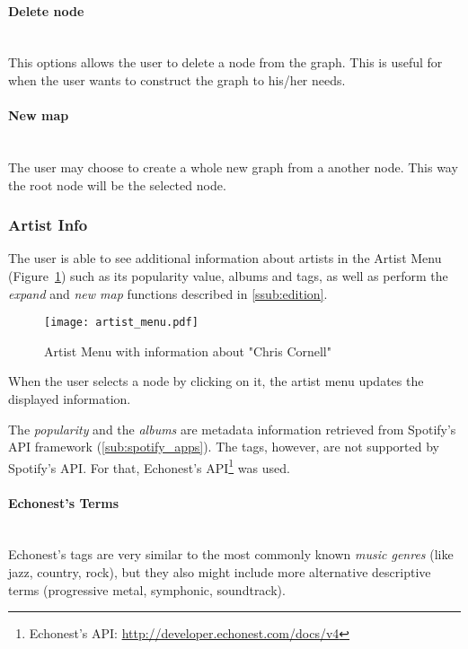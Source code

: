       \paragraph{Delete node} \hfill \\
      This options allows the user to delete a node from the graph.
      This is useful for when the user wants to construct the graph to his/her needs.

      \paragraph{New map} \hfill \\
      The user may choose to create a whole new graph from a another node.
      This way the root node will be the selected node.



    \subsubsection{Artist Info} %
      \label{ssub:artist_info}
      The user is able to see additional information about artists in the Artist Menu (Figure~\ref{fig:artist_menu}) such as its popularity value, albums and tags, as well as perform the \emph{expand} and \emph{new map} functions described in \ref{ssub:edition}.
      \begin{figure}[tb]
        \begin{center}
          \texttt{[image: artist\_menu.pdf]}
        \end{center}
        \caption{Artist Menu with information about "Chris Cornell"}
        \label{fig:artist_menu}
      \end{figure}
      When the user selects a node by clicking on it, the artist menu updates the displayed information.

      The \emph{popularity} and the \emph{albums} are metadata information retrieved from Spotify's API framework (\ref{sub:spotify_apps}).
      The tags, however, are not supported by Spotify's API.
      For that, Echonest's API\footnote{Echonest's API: \url{http://developer.echonest.com/docs/v4}} was used.

      \paragraph{Echonest's Terms} \hfill \\
      Echonest's tags are very similar to the most commonly known \emph{music genres} (like jazz, country, rock), but they also might include more alternative descriptive terms (progressive metal, symphonic, soundtrack).


